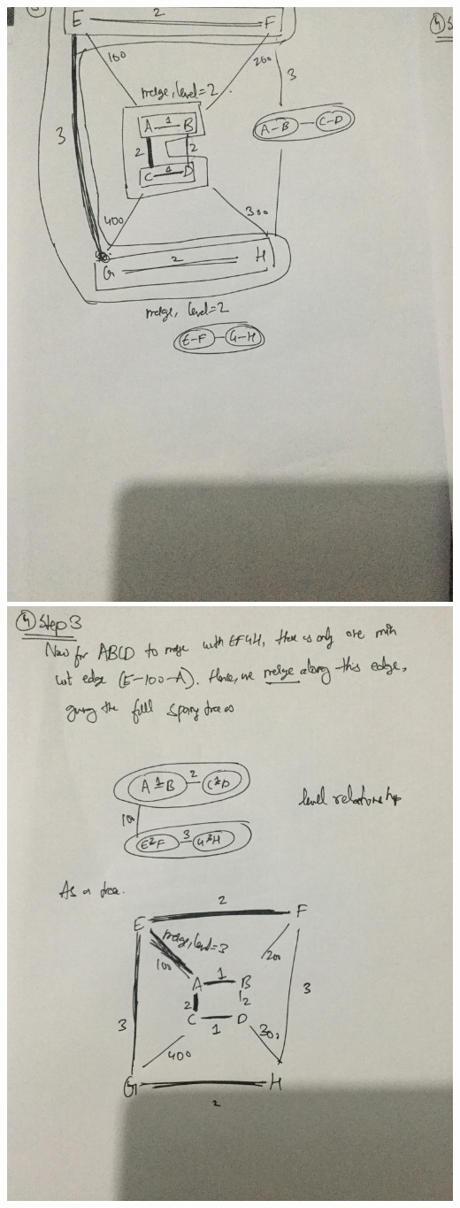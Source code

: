 \documentclass{article}
\begin{document}
\includegraphics[width=1\textwidth, angle=270]{IMG_0628.JPG}
\includegraphics[width=1\textwidth, angle=270]{IMG_0629.JPG}
\end{document}
